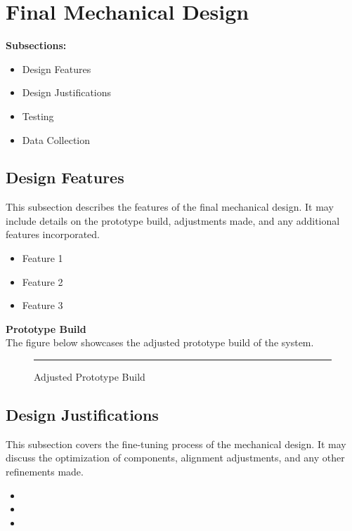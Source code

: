 \documentclass{UoNMCHA}
\numberwithin{equation}{section}
\begin{document}
\section{Final Mechanical Design}\label{sec:Final Mechanical Design}
\textbf{Subsections:}\\
\begin{itemize}
	\item Design Features
	\item Design Justifications
	\item Testing
	\item Data Collection
\end{itemize}

\subsection{Design Features}\label{sub:Design Features}
This subsection describes the features of the final mechanical design. It may include details on the prototype build, adjustments made, and any additional features incorporated.\\

\begin{itemize}
	\item Feature 1
	\item Feature 2
	\item Feature 3
\end{itemize}
\textbf{Prototype Build}\\

The figure below showcases the adjusted prototype build of the system.
\begin{figure}[h]
	\centering
	\rule{0.5\textwidth}{0.5\textwidth}%
	\caption{Adjusted Prototype Build}
	\label{fig:Adjusted Prototype Build}
\end{figure}

\subsection{Design Justifications}\label{sub:Design Justifications}
This subsection covers the fine-tuning process of the mechanical design. It may discuss the optimization of components, alignment adjustments, and any other refinements made.\\

\begin{itemize}
	\item 
	\item 
	\item 
\end{itemize}
\newpage
\end{document}
